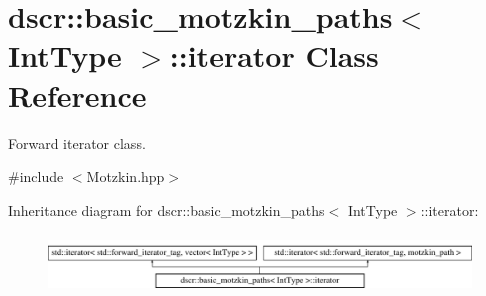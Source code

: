 \hypertarget{classdscr_1_1basic__motzkin__paths_1_1iterator}{\section{dscr\-:\-:basic\-\_\-motzkin\-\_\-paths$<$ Int\-Type $>$\-:\-:iterator Class Reference}
\label{classdscr_1_1basic__motzkin__paths_1_1iterator}
}


Forward iterator class.  




{\ttfamily \#include $<$Motzkin.\-hpp$>$}

Inheritance diagram for dscr\-:\-:basic\-\_\-motzkin\-\_\-paths$<$ Int\-Type $>$\-:\-:iterator\-:\begin{figure}[H]
\begin{center}
\leavevmode
\includegraphics[height=1.586402cm]{classdscr_1_1basic__motzkin__paths_1_1iterator}
\end{center}
\end{figure}
